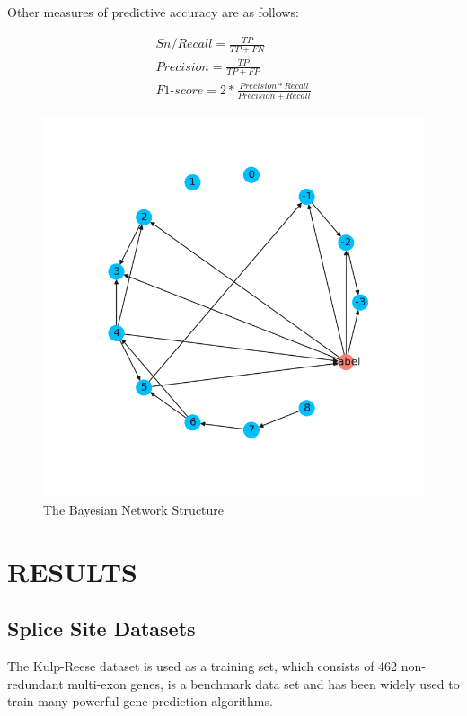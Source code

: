 \documentclass{gapd}
\begin{document}
Other measures of predictive accuracy are as follows:

\begin{gather*}%
  Sn/Recall = \frac{TP}{TP+FN} \\
  Precision = \frac{TP}{TP+FP} \\
  F1\text{-}score =2* \frac{Precision*Recall}{Precision+Recall}
\end{gather*}



\begin{figure}
  \centering
  \includegraphics[width=\columnwidth]{assets/network-20210609212835-4n4fayy.png}
  \caption{The Bayesian Network Structure}
  \label{fig:network}
\end{figure}  



\section{RESULTS}\label{results}

\subsection{Splice Site Datasets}\label{splice-site-datasets}

The Kulp-Reese dataset is used as a training set, which consists of
462 non-redundant multi-exon genes, is a benchmark data set and has been
widely used to train many powerful gene prediction algorithms.
\end{document}

